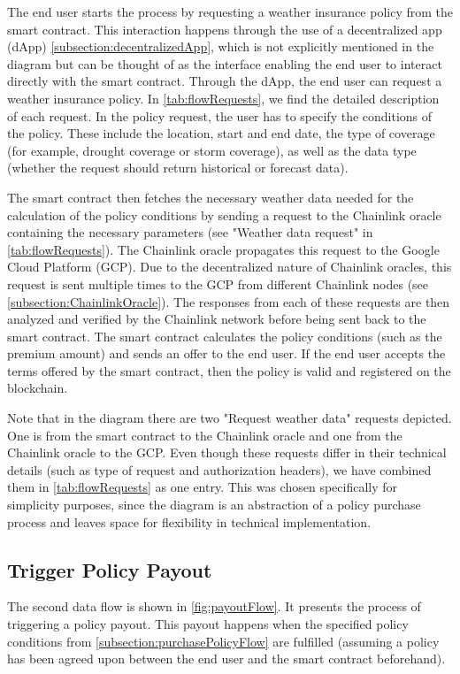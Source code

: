The end user starts the process by requesting a weather insurance policy from the smart contract. This interaction happens through the use of a decentralized app (dApp) \cref{subsection:decentralizedApp}, which is not explicitly mentioned in the diagram but can be thought of as the interface enabling the end user to interact directly with the smart contract. Through the dApp, the end user can request a weather insurance policy. In \cref{tab:flowRequests}, we find the detailed description of each request. In the policy request, the user has to specify the conditions of the policy. These include the location, start and end date, the type of coverage (for example, drought coverage or storm coverage), as well as the data type (whether the request should return historical or forecast data).

The smart contract then fetches the necessary weather data needed for the calculation of the policy conditions by sending a request to the Chainlink oracle containing the necessary parameters (see "Weather data request" in \cref{tab:flowRequests}). The Chainlink oracle propagates this request to the Google Cloud Platform (GCP). Due to the decentralized nature of Chainlink oracles, this request is sent multiple times to the GCP from different Chainlink nodes (see \cref{subsection:ChainlinkOracle}). The responses from each of these requests are then analyzed and verified by the Chainlink network before being sent back to the smart contract. The smart contract calculates the policy conditions (such as the premium amount) and sends an offer to the end user. If the end user accepts the terms offered by the smart contract, then the policy is valid and registered on the blockchain.

Note that in the diagram there are two "Request weather data" requests depicted. One is from the smart contract to the Chainlink oracle and one from the Chainlink oracle to the GCP. Even though these requests differ in their technical details (such as type of request and authorization headers), we have combined them in \cref{tab:flowRequests} as one entry. This was chosen specifically for simplicity purposes, since the diagram is an abstraction of a policy purchase process and leaves space for flexibility in technical implementation.

\subsection{Trigger Policy Payout}\label{subsection:policyPayoutTrigger}
The second data flow is shown in \cref{fig:payoutFlow}. It presents the process of triggering a policy payout. This payout happens when the specified policy conditions from \cref{subsection:purchasePolicyFlow} are fulfilled (assuming a policy has been agreed upon between the end user and the smart contract beforehand).

